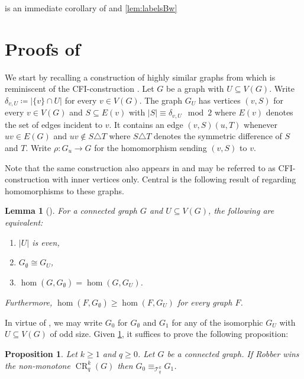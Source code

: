 \documentclass[10pt,a4paper]{article}
\newtheorem{lemma}[theorem]{Lemma}
\newtheorem{proposition}[theorem]{Proposition}
\newcommand{\Ekq}{\ensuremath{\mathcal{T}_{q}^{k}}}
\DeclareMathOperator{\CR}{CR}
\begin{document}
 is an immediate corollary of  and \ref{lem:labelsBw}

 
\section{Proofs of }
\label{app:td-closed}
We start by recalling a construction of highly similar graphs from \cite{roberson_oddomorphisms_2022} which is reminiscent of the CFI-construction \cite{cai_optimal_1992}.
Let $G$ be a graph with $U \subseteq V(G)$. Write $\delta_{v, U} \coloneqq |\{v\} \cap U|$ for every $v\in V(G)$.
The graph $G_U$ has vertices $(v, S)$ for every $v \in V(G)$ and $S \subseteq E(v)$ with $|S| \equiv \delta_{v, U} \mod 2$ where $E(v)$ denotes the set of edges incident to $v$. It contains an edge $(v, S)(u, T)$ whenever $uv \in E(G)$ and $uv \not\in S \triangle T$ where $S\triangle T$ denotes the symmetric difference of $S$ and $T$. Write $\rho \colon G_u \to G$ for the homomorphism sending $(v, S)$ to $v$.

Note that the same construction also appears in \cite{Furer01} and may be referred to as CFI-construction with inner vertices only. Central is the following result of \cite{roberson_oddomorphisms_2022} regarding homomorphisms to these graphs.

\begin{lemma}[{\cite[Corollary~3.7 and Theorem~3.13]{roberson_oddomorphisms_2022}}] \label{lem:roberson3.7}
	For a connected graph $G$ and $U \subseteq V(G)$, the following are equivalent:
	\begin{enumerate}
		\item $|U|$ is even,
		\item $G_\emptyset \cong G_U$,
		\item $\hom(G, G_\emptyset) = \hom(G, G_U)$.
	\end{enumerate}
	Furthermore, $\hom(F, G_\emptyset) \geq \hom(F, G_U)$ for every graph $F$.
\end{lemma}
In virtue of \cite[Lemma~3.2]{roberson_oddomorphisms_2022}, we may write $G_0$ for $G_\emptyset$ and $G_1$ for any of the isomorphic $G_U$ with $U \subseteq V(G)$ of odd size.
Given \cref{lem:roberson3.7}, it suffices to prove the following proposition:

\begin{proposition}\label{prop:closedness-td-core}
	Let $k \geq 1$ and $q \geq 0$.
	Let $G$ be a connected graph.
	If Robber wins the non-monotone $\CR^k_q(G)$ then $G_0 \equiv_{\Ekq} G_1$.
\end{proposition}
\end{document}
